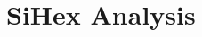 \documentclass{notebook}
\author{Alessia Maggi}
\begin{document}
\frontmatter
\maketitle

%
\tableofcontents

\mainmatter
\onehalfspacing
\chapter{SiHex Analysis}

%
%
%
%



%


\end{document}
